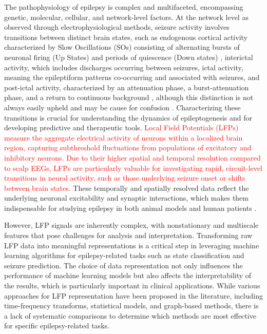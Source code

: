 \documentclass{article}
\begin{document}
The pathophysiology of epilepsy is complex and multifaceted, encompassing genetic, molecular, cellular, and network-level factors. At the network level as observed through electrophysiological methods, seizure activity involves transitions between distinct brain states, such as endogenous cortical activity characterized by Slow Oscillations (SOs) consisting of alternating bursts of neuronal firing (Up States) and periods of quiescence (Down states) \cite{jercog2017}, interictal activity, which includes discharges occurring between seizures, ictal activity, meaning the epileptiform patterns co-occurring and associated with seizures, and post-ictal activity, characterized by an attenuation phase, a burst-attenuation phase, and a return to continuous background \cite{bateman2019}, although this distinction is not always easily upheld and may be cause for confusion \cite{fisher2014,fisher2010}. Characterizing these transitions is crucial for understanding the dynamics of epileptogenesis and for developing predictive and therapeutic tools. \textcolor{red}{Local Field Potentials (LFPs) measure the aggregate electrical activity of neurons within a localized brain region, capturing subthreshold fluctuations from populations of excitatory and inhibitory neurons. Due to their higher spatial and temporal resolution compared to scalp EEGs, LFPs are particularly valuable for investigating rapid, circuit-level transitions in neural activity, such as those underlying seizure onset or shifts between brain states.} These temporally and spatially resolved data reflect the underlying neuronal excitability and synaptic interactions, which makes them indispensable for studying epilepsy in both animal models and human patients \cite{buzsaki2012}.

However, LFP signals are inherently complex, with nonstationary and multiscale features that pose challenges for analysis and interpretation. Transforming raw LFP data into meaningful representations is a critical step in leveraging machine learning algorithms for epilepsy-related tasks such as state classification and seizure prediction. The choice of data representation not only influences the performance of machine learning models but also affects the interpretability of the results, which is particularly important in clinical applications. While various approaches for LFP representation have been proposed in the literature, including time-frequency transforms, statistical models, and graph-based methods, there is a lack of systematic comparisons to determine which methods are most effective for specific epilepsy-related tasks.
\end{document}
